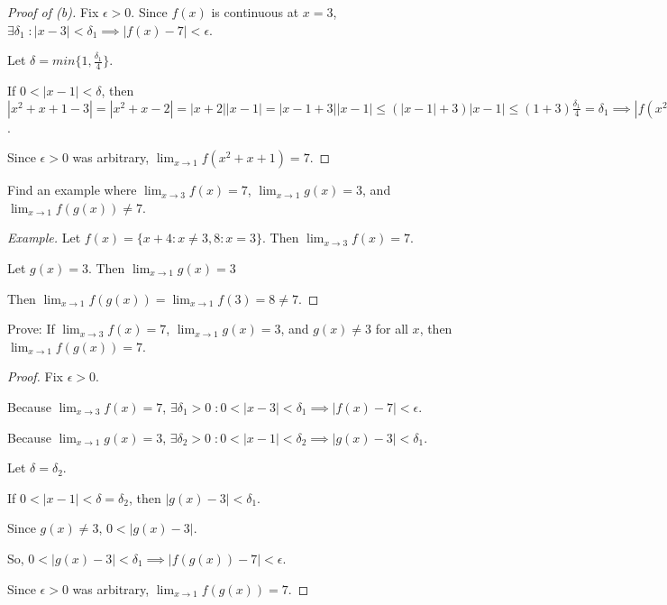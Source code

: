 \documentclass{article} %
\theoremstyle{plain}
\theoremstyle{definition}
\begin{document}
\begin{proof}[Proof of (b)] Fix $\epsilon > 0$. Since $f(x)$ is continuous at $x=3$, $\exists \delta_1 \; \colon |x-3| < \delta_1 \implies |f(x) - 7| < \epsilon$.

    Let $\delta = min\{1, \frac{\delta_1}{4}\}$.

    If $0 < |x-1| < \delta$, then $|x^2 + x + 1 - 3| = |x^2 + x - 2| = |x+2| |x-1| = |x-1+3| |x-1| \leq (|x-1| + 3) |x-1| \leq (1 + 3) \frac{\delta_1}{4} = \delta_1 \implies |f(x^2 + x + 1) - 7| < \epsilon$.

    Since $\epsilon > 0$ was arbitrary, $\lim_{x \rightarrow 1} f(x^2+x+1) = 7$.
\end{proof}


  
  \noindent{} Find an example where $\lim_{x \rightarrow 3} f(x) = 7$, $\lim_{x \rightarrow 1} g(x) = 3$, and $\lim_{x \rightarrow 1} f(g(x)) \neq 7$.  
  
\begin{proof}[Example] 
    Let $f(x) = \{x+4 \colon x \neq 3, 8 \colon x = 3 \}$. Then $\lim_{x \rightarrow 3} f(x) = 7$.

    Let $g(x) = 3$. Then $\lim_{x \rightarrow 1} g(x) = 3$

    Then $\lim_{x \to 1} f(g(x)) = \lim_{x \to 1} f(3) = 8 \neq 7$.

\end{proof}
  
    \noindent{} Prove: If $\lim_{x \rightarrow 3} f(x) = 7$, $\lim_{x \rightarrow 1} g(x) = 3$, and $g(x) \neq 3$ for all $x$, then $\lim_{x \rightarrow 1} f(g(x))=7$. 


\begin{proof} Fix $\epsilon > 0$.

    Because $\lim_{x \rightarrow 3} f(x) = 7$, $\exists \delta_1 > 0 \; \colon 0 < |x-3| < \delta_1 \implies |f(x) - 7| < \epsilon$.

    Because $\lim_{x \rightarrow 1} g(x) = 3$, $\exists \delta_2 > 0 \; \colon 0 < |x-1| < \delta_2 \implies |g(x) - 3| < \delta_1$.

    Let $\delta = \delta_2$.

    If $0 < |x-1| < \delta = \delta_2$, then $|g(x) - 3| < \delta_1$.

    Since $g(x) \neq 3$, $0 < |g(x) -3|$.

    So, $0 < |g(x) - 3| < \delta_1 \implies |f(g(x)) - 7| < \epsilon$.
    
    Since $\epsilon > 0$ was arbitrary, $\lim_{x \rightarrow 1} f(g(x))=7$. 

\end{proof}
\end{document}
